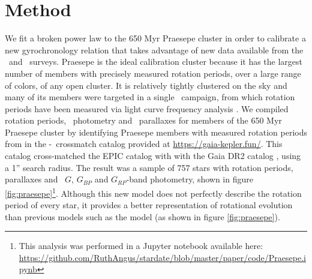 \section{Method}
\label{section:method}

We fit a broken power law to the 650 Myr Praesepe cluster in order to
calibrate a new gyrochronology relation that takes advantage of new data
available from the \ktwo\ and \gaia\ surveys.
Praesepe is the ideal calibration cluster because it has the largest number of
members with precisely measured rotation periods, over a large range of
colors, of any open cluster.
It is relatively tightly clustered on the sky and many of its members were
targeted in a single \ktwo\ campaign, from which rotation periods have been
measured via light curve frequency analysis \citep{douglas2017, rebull2017}.
We compiled rotation periods, \Gaia\ photometry and \gaia\ parallaxes for
members of the 650 Myr Praesepe cluster \citep{fossati2008} by identifying
Praesepe members with measured rotation periods from \citet{douglas2017} in
the \ktwo-\gaia\ crossmatch catalog provided at
\url{https://gaia-kepler.fun/}.
This catalog cross-matched the EPIC catalog \citep{huber2016} with with the
Gaia DR2 catalog \citep{brown2018}, using a 1'' search radius.
The result was a sample of 757 stars with rotation periods, parallaxes and
\gaia\ $G$, $G_{BP}$ and $G_{RP}$-band photometry, shown in figure
\ref{fig:praesepe}\footnote{This analysis was performed in a Jupyter notebook
available here: \url{
    https://github.com/RuthAngus/stardate/blob/master/paper/code/Praesepe.ipynb}}.
Although this new model does not perfectly describe the rotation period of
every star, it provides a better representation of rotational evolution than
previous models such as the \citet{angus2015} model (as shown in figure
\ref{fig:praesepe}).

